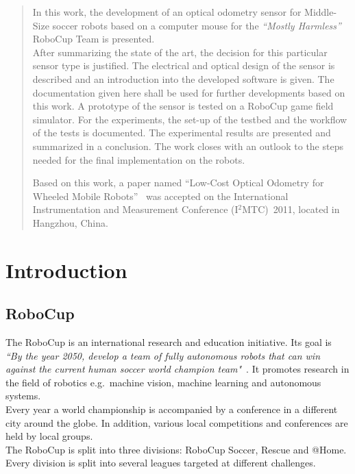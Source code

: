 \documentclass[12pt,a4paper]{article}
\newcommand{\MH}{\emph{``Mostly Harmless''} RoboCup Team\xspace}
\begin{document}


\tableofcontents
\clearpage
\pagestyle{plain}


\begin{abstract}

In this work, the development of an optical odometry sensor for Middle-Size soccer robots based on a computer mouse for the \MH is presented.\\
After summarizing the state of the art, the decision for this particular sensor type is justified.
The electrical and optical design of the sensor is described and an introduction into the developed software is given.
The documentation given here shall be used for further developments based on this work.
A prototype of the sensor is tested on a RoboCup game field simulator.
For the experiments, the set-up of the testbed and the workflow of the tests is documented.
The experimental results are presented and summarized in a conclusion.
The work closes with an outlook to the steps needed for the final implementation on the robots.

Based on this work, a paper named ``Low-Cost Optical Odometry for Wheeled Mobile Robots''~\cite{i2mtc} was accepted on the International Instrumentation and Measurement Conference (I$^2$MTC)~2011, located in Hangzhou, China.

\end{abstract}

\clearpage

\section{Introduction}


\subsection{RoboCup}

The RoboCup is an international research and education initiative. 
Its goal is \emph{``By the year 2050, develop a team of fully autonomous robots that can win against the current human soccer world champion team"}~\cite{robocup.org}.
It promotes research in the field of robotics e.g.\ machine vision, machine learning and autonomous systems.\\
Every year a world championship is accompanied by a conference in a different city around the globe.
In addition, various local competitions and conferences are held by local groups.\\
The RoboCup is split into three divisions: RoboCup Soccer, Rescue and @Home.
Every division is split into several leagues targeted at different challenges.
\end{document}

